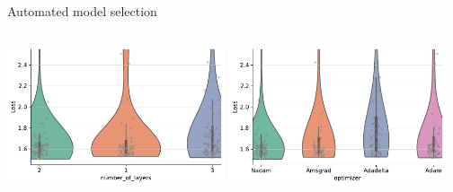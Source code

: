 \documentclass[aspectratio=169,9pt]{beamer}
\begin{document}
\begin{frame}[t]{Automated model selection}
\begin{columns}
\begin{column}{0.48\textwidth}
\begin{center}
                \includegraphics[width=0.48\textwidth]{sec_methodology_hyperopt_plot_number_of_layers.pdf}
                \includegraphics[width=0.48\textwidth]{sec_methodology_hyperopt_plot_optimizers.pdf}
            \end{center}
        \end{column}
    \end{columns}
\end{frame}





\end{document}

